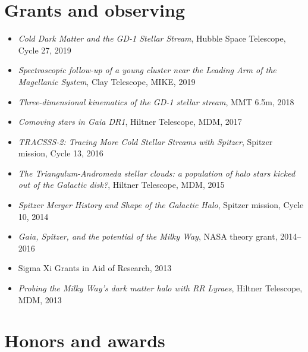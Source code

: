 \documentclass[12pt, letterpaper]{apw-cv}
\begin{document}
%         

\section*{Grants and observing}

    \begin{itemize}
    \item {\it Cold Dark Matter and the GD-1 Stellar Stream}, Hubble Space Telescope, Cycle 27, 2019
    \item {\it Spectroscopic follow-up of a young cluster near the Leading Arm of the Magellanic System}, Clay Telescope, MIKE, 2019
    \item {\it Three-dimensional kinematics of the GD-1 stellar stream}, MMT 6.5m, 2018 %
    \item {\it Comoving stars in Gaia DR1}, Hiltner Telescope, MDM, 2017 %
    \item {\it TRACSSS-2: Tracing More Cold Stellar Streams with Spitzer}, Spitzer mission, Cycle 13, 2016 %
	\item {\it The Triangulum-Andromeda stellar clouds: a population of halo stars kicked out of the Galactic disk?}, Hiltner Telescope, MDM, 2015 %
	\item {\it Spitzer Merger History and Shape of the Galactic Halo}, Spitzer mission, Cycle 10, 2014 %
	\item {\it Gaia, Spitzer, and the potential of the Milky Way}, NASA theory grant, 2014--2016 %
	\item Sigma Xi Grants in Aid of Research, 2013 %
	\item {\it Probing the Milky Way's dark matter halo with RR Lyraes}, Hiltner Telescope, MDM, 2013 %
	\end{itemize}

\section*{Honors and awards}
\end{document}
